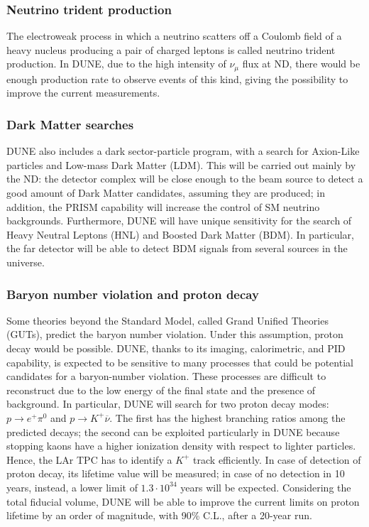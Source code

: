 \subsubsection{Neutrino trident production}
The electroweak process in which a neutrino scatters off a Coulomb field of a heavy nucleus producing a pair of charged leptons is called neutrino trident production. In DUNE, due to the high intensity of $\nu_{\mu}$ flux at ND, there would be enough production rate to observe events of this kind, giving the possibility to improve the current measurements.

\subsubsection{Dark Matter searches} 
DUNE also includes a dark sector-particle program, with a search for Axion-Like particles and Low-mass Dark Matter (LDM). This will be carried out mainly by the ND: the detector complex will be close enough to the beam source to detect a good amount of Dark Matter candidates, assuming they are produced; in addition, the PRISM capability will increase the control of SM neutrino backgrounds. 
Furthermore, DUNE will have unique sensitivity for the search of Heavy Neutral Leptons (HNL) and Boosted Dark Matter (BDM). In particular, the far detector will be able to detect BDM signals from several sources in the universe.

\subsubsection{Baryon number violation and proton decay}
Some theories beyond the Standard Model, called Grand Unified Theories (GUTs), predict the baryon number violation. Under this assumption, proton decay would be possible. DUNE, thanks to its imaging, calorimetric, and PID capability, is expected to be sensitive to many processes that could be potential candidates for a baryon-number violation. These processes are difficult to reconstruct due to the low energy of the final state and the presence of background. In particular, DUNE will search for two proton decay modes: $p \rightarrow e^+ \pi^0$ and $p \rightarrow K^+ \overline{\nu}$. The first has the highest branching ratios among the predicted decays; the second can be exploited particularly in DUNE because stopping kaons have a higher ionization density with respect to lighter particles. Hence, the LAr TPC has to identify a $K^+$ track efficiently. 
In case of detection of proton decay, its lifetime value will be measured; in case of no detection in 10 years, instead, a lower limit of $1.3 \cdot 10^{34}$ years will be expected.
Considering the total fiducial volume, DUNE will be able to improve the current limits on proton lifetime by an order of magnitude, with 90\% C.L., after a 20-year run.


